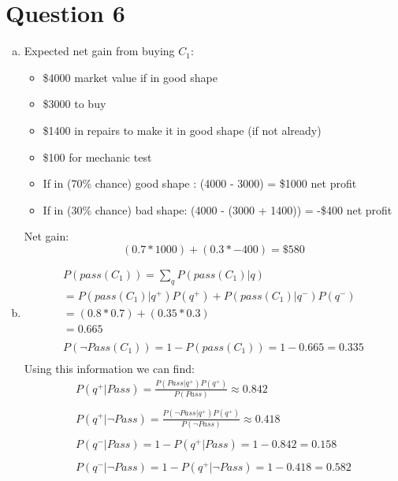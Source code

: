 \documentclass{article}
\begin{document}
\section*{Question 6}
\begin{enumerate}[a)]
    \item Expected net gain from buying $C_1$:
    \begin{itemize}
        \item \$4000 market value if in good shape
        \item \$3000 to buy
        \item \$1400 in repairs to make it in good shape (if not already)
        \item \$100 for mechanic test
        \item If in (70\% chance) good shape : (4000 - 3000) = \$1000 net profit
        \item If in (30\% chance) bad shape: (4000 - (3000 + 1400)) = -\$400 net profit
    \end{itemize}
    Net gain:
        \[ (0.7 * 1000) + (0.3 * -400) = \$580 \]
    \item
        \begin{gather*}
            P(pass(C_1)) = \sum_{q}P(pass(C_1) | q)\\
                    = P(pass(C_1) | q^+) P(q^+) + P(pass(C_1) | q^-) P(q^-)\\
                    = (0.8 * 0.7) + (0.35 * 0.3) \\= 0.665\\
            \\
            P(\neg Pass(C_1)) = 1 - P(pass(C_1)) = 1 - 0.665 = 0.335\\
        \end{gather*}
        Using this information we can find:
        \begin{gather*}
            P(q^+ | Pass) = \frac{P(Pass | q^+)P(q^+)}{P(Pass)} \approx 0.842\\
            \\
            P(q^+ | \neg Pass) = \frac{P(\neg Pass | q^+)P(q^+)}{P(\neg Pass)} \approx 0.418\\
            \\
            P(q^- | Pass) = 1 - P(q^+ | Pass) = 1 - 0.842 = 0.158\\
            \\
            P(q^- | \neg Pass) = 1 - P(q^+ | \neg Pass) = 1 - 0.418 = 0.582\\
        \end{gather*}

\end{enumerate}
\end{document}
